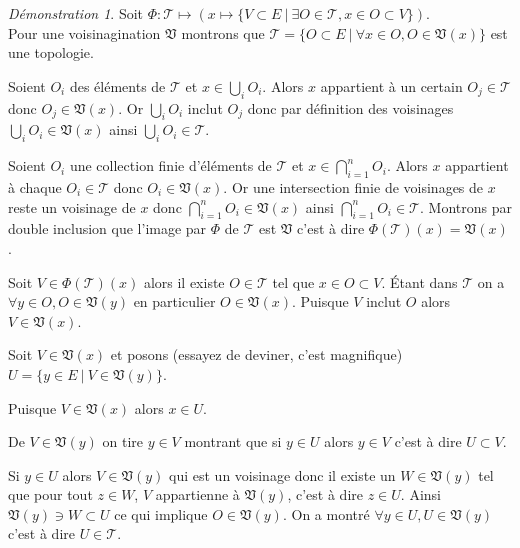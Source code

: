 \documentclass[a4paper, 11pt, french]{book}
\newenvironment{itemise}{\itemize}{\enditemize}
\theoremstyle{plain} %
\theoremstyle{definition} %
\theoremstyle{remark} %
\newtheorem*{demonstration}{Démonstration}
\newcommand{\1}{\mathds{1}}
\newcommand\ens[2]{\{#1 \ |\ #2\}}
\begin{document}
\begin{demonstration}
	Soit $\Phi:\mathscr{T}\mapsto(x\mapsto\ens{V\subset E}{\exists O\in\mathscr{T}, x\in O\subset V})$. \\
	Pour une voisinagination $\mathfrak{V}$ montrons que $\mathscr{T}=\ens{O\subset E}{\forall x\in O, O\in\mathfrak{V}(x)}$ est une topologie.
	\begin{itemise}
		\item Soient $O_i$ des éléments de $\mathscr{T}$ et $x\in\bigcup_iO_i$.
		Alors $x$ appartient à un certain $O_j\in\mathscr{T}$ donc $O_j\in\mathfrak{V}(x)$.
		Or $\bigcup_iO_i$ inclut $O_j$ donc par définition des voisinages $\bigcup_iO_i\in\mathfrak{V}(x)$ ainsi $\bigcup_iO_i\in\mathscr{T}$.
		\item Soient $O_i$ une collection finie d'éléments de $\mathscr{T}$ et $x\in\bigcap_{i=1}^nO_i$.
		Alors $x$ appartient à chaque $O_i\in\mathscr{T}$ donc $O_i\in\mathfrak{V}(x)$.
		Or une intersection finie de voisinages de $x$ reste un voisinage de $x$ donc $\bigcap_{i=1}^nO_i\in\mathfrak{V}(x)$ ainsi $\bigcap_{i=1}^nO_i\in\mathscr{T}$.
	\end{itemise}
	Montrons par double inclusion que l'image par $\Phi$ de $\mathscr{T}$ est $\mathfrak{V}$ c'est à dire $\Phi(\mathscr{T})(x)=\mathfrak{V}(x)$.
	\begin{itemise}
		\item Soit $V\in\Phi(\mathscr{T})(x)$ alors il existe $O\in\mathscr{T}$ tel que $x\in O\subset V$.
		Étant dans $\mathscr{T}$ on a $\forall y\in O, O\in\mathfrak{V}(y)$ en particulier $O\in\mathfrak{V}(x)$.
		Puisque $V$ inclut $O$ alors $V\in\mathfrak{V}(x)$.
		\item Soit $V\in\mathfrak{V}(x)$ et posons (essayez de deviner, c'est magnifique) $U=\ens{y\in E}{V\in\mathfrak{V}(y)}$.
		\begin{itemise}
			\item Puisque $V\in\mathfrak{V}(x)$ alors $x\in U$.
			\item De $V\in\mathfrak{V}(y)$ on tire $y\in V$ montrant que si $y\in U$ alors $y\in V$ c'est à dire $U\subset V$.
			\item Si $y\in U$ alors $V\in\mathfrak{V}(y)$ qui est un voisinage donc il existe un $W\in\mathfrak{V}(y)$ tel que pour tout $z\in W$, $V$ appartienne à $\mathfrak{V}(y)$, c'est à dire $z\in U$.
			Ainsi $\mathfrak{V}(y)\ni W\subset U$ ce qui implique $O\in\mathfrak{V}(y)$.
			On a montré $\forall y\in U, U\in\mathfrak{V}(y)$ c'est à dire $U\in\mathscr{T}$.
		\end{itemise}

\end{itemise}
\end{demonstration}
\end{document}

